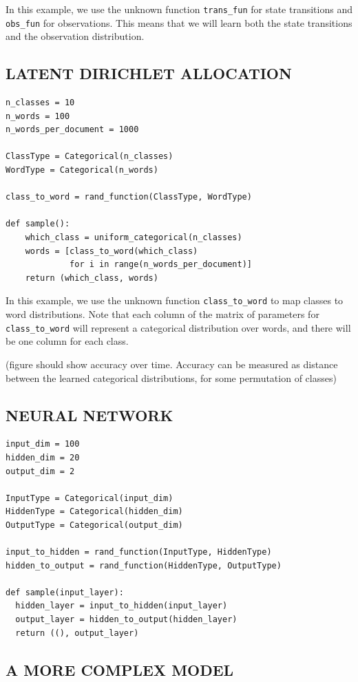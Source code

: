 \documentclass{article}
\begin{document}
In this example, we use the unknown function \texttt{trans\_fun} for state transitions and \texttt{obs\_fun} for observations.  This means that we will learn both the state transitions and the observation distribution.


\subsection{LATENT DIRICHLET ALLOCATION}
{\small
\begin{verbatim}
n_classes = 10
n_words = 100
n_words_per_document = 1000

ClassType = Categorical(n_classes)
WordType = Categorical(n_words)

class_to_word = rand_function(ClassType, WordType)

def sample():
    which_class = uniform_categorical(n_classes)
    words = [class_to_word(which_class)
             for i in range(n_words_per_document)]
    return (which_class, words)
\end{verbatim}
}

In this example, we use the unknown function \texttt{class\_to\_word} to map classes to word distributions.  Note that each column of the matrix of parameters for \texttt{class\_to\_word} will represent a categorical distribution over words, and there will be one column for each class.

(figure should show accuracy over time.  Accuracy can be measured as distance between the learned categorical distributions, for some permutation of classes)

\subsection{NEURAL NETWORK}

{\small
\begin{verbatim}
input_dim = 100
hidden_dim = 20
output_dim = 2

InputType = Categorical(input_dim)
HiddenType = Categorical(hidden_dim)
OutputType = Categorical(output_dim)

input_to_hidden = rand_function(InputType, HiddenType)
hidden_to_output = rand_function(HiddenType, OutputType)

def sample(input_layer):
  hidden_layer = input_to_hidden(input_layer)
  output_layer = hidden_to_output(hidden_layer)
  return ((), output_layer)
\end{verbatim}
}

\subsection{A MORE COMPLEX MODEL}
\end{document}
